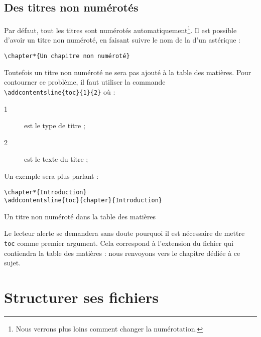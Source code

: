 \subsection{Des titres non numérotés}
Par défaut, tout les titres sont numérotés automatiquement\footnote{Nous verrons plus loins comment changer la numérotation.}. Il est possible d'avoir un titre non numéroté, en faisant suivre le nom de la  d'un astérique :
\begin{verbatim}
\chapter*{Un chapitre non numéroté}
\end{verbatim}

Toutefois un titre non numéroté ne sera pas ajouté à la table des matières. Pour contourner ce problème, il faut utiliser la commande \\
\verb|\addcontentsline{toc}{1}{2}| où :
\begin{description}
	\item[1] est le type de titre ;
	\item[2] est le texte du titre ;
\end{description}

Un exemple sera plus parlant :

\begin{listing}[ht]
\begin{verbatim}
\chapter*{Introduction}
\addcontentsline{toc}{chapter}{Introduction}
\end{verbatim}
\caption{Un titre non numéroté dans la table des matières}
\end{listing}

\begin{anedocte}
Le lecteur alerte se demandera sans doute pourquoi il est nécessaire de mettre \verb|toc| comme premier argument. Cela correspond à l'extension du fichier qui contiendra la table des matières : nous renvoyons vers le chapitre dédiée à ce sujet.
\end{anedocte}

\section{Structurer ses fichiers}

